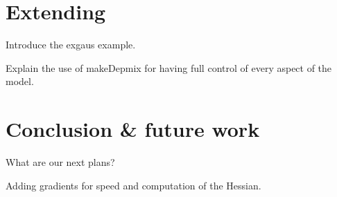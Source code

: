 \documentclass[article]{jss}
\begin{document}
\section{Extending }

Introduce the exgaus example. 

Explain the use of makeDepmix for having full control of every aspect of the model. 




\section{Conclusion \& future work}


What are our next plans?

Adding gradients for speed and computation of the Hessian. 



\end{document}
